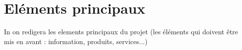 \section{Eléments principaux}
In on redigera les elements principaux du projet
(les éléments qui doivent être mis en avant : information, produits, services...)